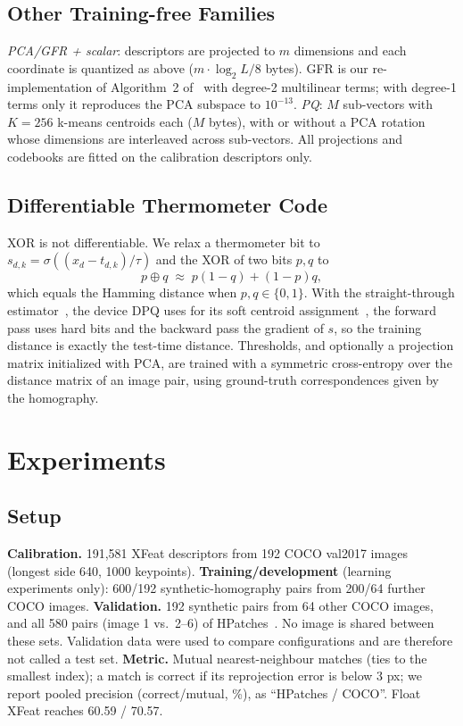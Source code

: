 \documentclass[10pt,conference]{IEEEtran}
\begin{document}
\subsection{Other Training-free Families}
\emph{PCA/GFR + scalar}: descriptors are projected to $m$ dimensions and each coordinate is quantized as above ($m\cdot\log_2 L/8$ bytes). GFR is our re-implementation of Algorithm~2 of~\cite{gfr} with degree-2 multilinear terms; with degree-1 terms only it reproduces the PCA subspace to $10^{-13}$. \emph{PQ}: $M$ sub-vectors with $K{=}256$ k-means centroids each ($M$ bytes), with or without a PCA rotation whose dimensions are interleaved across sub-vectors. All projections and codebooks are fitted on the calibration descriptors only.

\subsection{Differentiable Thermometer Code}
XOR is not differentiable. We relax a thermometer bit to $s_{d,k}=\sigma((x_d-t_{d,k})/\tau)$ and the XOR of two bits $p,q$ to
\begin{equation}
p\oplus q\;\approx\;p(1-q)+(1-p)q ,
\end{equation}
which equals the Hamming distance when $p,q\in\{0,1\}$. With the straight-through estimator~\cite{ste}, the device DPQ uses for its soft centroid assignment~\cite{dpq}, the forward pass uses hard bits and the backward pass the gradient of $s$, so the training distance is exactly the test-time distance. Thresholds, and optionally a projection matrix initialized with PCA, are trained with a symmetric cross-entropy over the distance matrix of an image pair, using ground-truth correspondences given by the homography.

\section{Experiments}
\subsection{Setup}
\textbf{Calibration.} 191,581 XFeat descriptors from 192 COCO val2017 images~\cite{coco} (longest side 640, 1000 keypoints). \textbf{Training/development} (learning experiments only): 600/192 synthetic-homography pairs from 200/64 further COCO images. \textbf{Validation.} 192 synthetic pairs from 64 other COCO images, and all 580 pairs (image 1 vs.\ 2--6) of HPatches~\cite{hpatches}. No image is shared between these sets. Validation data were used to compare configurations and are therefore not called a test set. \textbf{Metric.} Mutual nearest-neighbour matches (ties to the smallest index); a match is correct if its reprojection error is below 3 px; we report pooled precision (correct/mutual, \%), as ``HPatches / COCO''. Float XFeat reaches 60.59 / 70.57.
\end{document}
